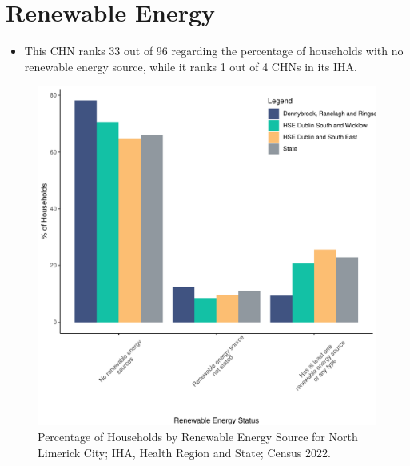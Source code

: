 \documentclass{article}
\begin{document}
\section{Renewable Energy}\label{sect:RE}
\begin{itemize}
\item This CHN ranks  33 out of 96 regarding the percentage of households with no renewable energy source, while it ranks   1 out of 4 CHNs in its IHA.
\end{itemize}
\begin{figure}[H]
	\centering
	\includegraphics[width = 140mm]{../figures/RenewableEnergyED.pdf}
	\caption{Percentage of Households by Renewable Energy Source for North Limerick City; IHA, Health Region and State; Census 2022.}
	\label{fig:vbnv}
	\end{figure}
\end{document}
